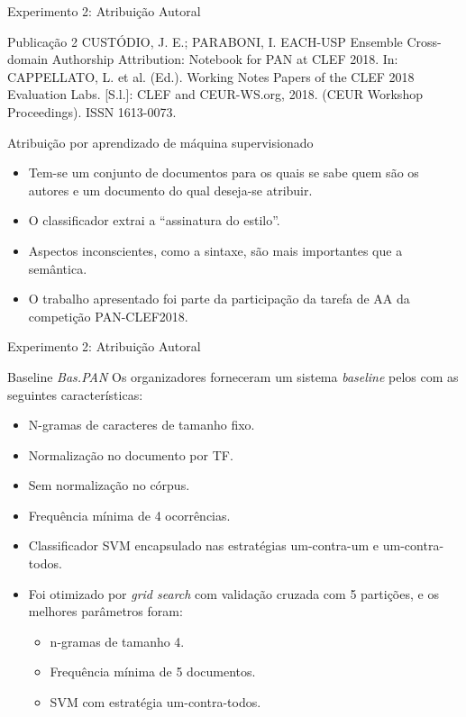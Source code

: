 \begin{frame}{Experimento 2: Atribuição Autoral}
	\begin{block}{Publicação 2}
		CUSTÓDIO, J. E.; PARABONI, I. EACH-USP Ensemble Cross-domain Authorship
		Attribution: Notebook for PAN at CLEF 2018. In: CAPPELLATO, L. et al. (Ed.).
		Working Notes Papers of the CLEF 2018 Evaluation Labs. [S.l.]: CLEF and CEUR-WS.org,
		2018. (CEUR Workshop Proceedings). ISSN 1613-0073.
	\end{block}
	
	\begin{block}{Atribuição por aprendizado de máquina supervisionado}
	\begin{itemize}
		\item Tem-se um conjunto de documentos para os quais se sabe quem são os autores e um documento do qual deseja-se atribuir.
		\item O classificador extrai a ``assinatura do estilo''.
		\item Aspectos inconscientes, como a sintaxe, são mais importantes que a semântica.
		\item O trabalho apresentado foi parte da participação da tarefa de AA da competição PAN-CLEF2018.
	\end{itemize}
	\end{block}
\end{frame}
	
\begin{frame}{Experimento 2: Atribuição Autoral}
	\begin{block}{Baseline {\it Bas.PAN}}
		Os organizadores forneceram um sistema {\it baseline} pelos com as seguintes características:
		\begin{itemize}
			\item N-gramas de caracteres de tamanho fixo.
			\item Normalização no documento por TF.
			\item Sem normalização no córpus.
			\item Frequência mínima de 4 ocorrências.
			\item Classificador SVM encapsulado nas estratégias um-contra-um e um-contra-todos.
			\item Foi otimizado por {\it grid search} com validação cruzada com 5 partições, e os melhores parâmetros foram:
			\begin{itemize}\selectFont
				\item n-gramas de tamanho 4.
				\item Frequência mínima de 5 documentos.
				\item SVM com estratégia um-contra-todos.
			\end{itemize}
		\end{itemize}
	\end{block}
\end{frame}

